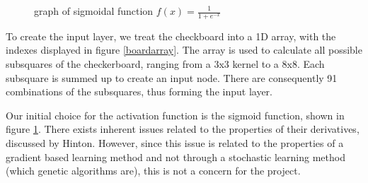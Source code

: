 \documentclass[12pt,a4paper]{article}
\begin{document}
    \begin{figure}
        \centering
        \caption{graph of sigmoidal function $f(x)=\frac{1}{1+e^{-x}}$ \label{sigmoid}}
    \end{figure}

    To create the input layer, we treat the checkboard into a 1D array, with the indexes displayed in figure \ref{boardarray}. The array is used to calculate all possible subsquares of the checkerboard, ranging from a 3x3 kernel to a 8x8. Each subsquare is summed up to create an input node. There are consequently 91 combinations of the subsquares, thus forming the input layer. 

    Our initial choice for the activation function is the sigmoid function, shown in figure \ref{sigmoid}. There exists inherent issues related to the properties of their derivatives, discussed by Hinton. However, since this issue is related to the properties of a gradient based learning method and not through a stochastic learning method (which genetic algorithms are), this is not a concern for the project.
\end{document}
